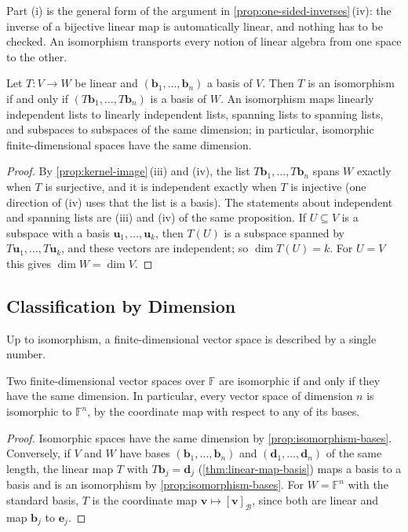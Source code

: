 Part (i) is the general form of the argument in \cref{prop:one-sided-inverses}\,(iv): the inverse of a bijective linear map is automatically linear, and nothing has to be checked. An isomorphism transports every notion of linear algebra from one space to the other.

\begin{proposition}
\label{prop:isomorphism-bases}
Let $T\colon V\to W$ be linear and $(\mathbf b_1,\ldots,\mathbf b_n)$ a basis of $V$. Then $T$ is an isomorphism if and only if $(T\mathbf b_1,\ldots,T\mathbf b_n)$ is a basis of $W$. An isomorphism maps linearly independent lists to linearly independent lists, spanning lists to spanning lists, and subspaces to subspaces of the same dimension; in particular, isomorphic finite-dimensional spaces have the same dimension.
\end{proposition}

\begin{proof}
By \cref{prop:kernel-image}\,(iii) and (iv), the list $T\mathbf b_1,\ldots,T\mathbf b_n$ spans $W$ exactly when $T$ is surjective, and it is independent exactly when $T$ is injective (one direction of (iv) uses that the list is a basis). The statements about independent and spanning lists are (iii) and (iv) of the same proposition. If $U\subseteq V$ is a subspace with a basis $\mathbf u_1,\ldots,\mathbf u_k$, then $T(U)$ is a subspace spanned by $T\mathbf u_1,\ldots,T\mathbf u_k$, and these vectors are independent; so $\dim T(U)=k$. For $U=V$ this gives $\dim W=\dim V$.
\end{proof}

\subsection{Classification by Dimension}

Up to isomorphism, a finite-dimensional vector space is described by a single number.

\begin{theorem}
\label{thm:isomorphic-dimension}
Two finite-dimensional vector spaces over $\mathbb F$ are isomorphic if and only if they have the same dimension. In particular, every vector space of dimension $n$ is isomorphic to $\mathbb F^n$, by the coordinate map with respect to any of its bases.
\end{theorem}

\begin{proof}
Isomorphic spaces have the same dimension by \cref{prop:isomorphism-bases}. Conversely, if $V$ and $W$ have bases $(\mathbf b_1,\ldots,\mathbf b_n)$ and $(\mathbf d_1,\ldots,\mathbf d_n)$ of the same length, the linear map $T$ with $T\mathbf b_j=\mathbf d_j$ (\cref{thm:linear-map-basis}) maps a basis to a basis and is an isomorphism by \cref{prop:isomorphism-bases}. For $W=\mathbb F^n$ with the standard basis, $T$ is the coordinate map $\mathbf v\mapsto[\mathbf v]_{\mathcal B}$, since both are linear and map $\mathbf b_j$ to $\mathbf e_j$.
\end{proof}

